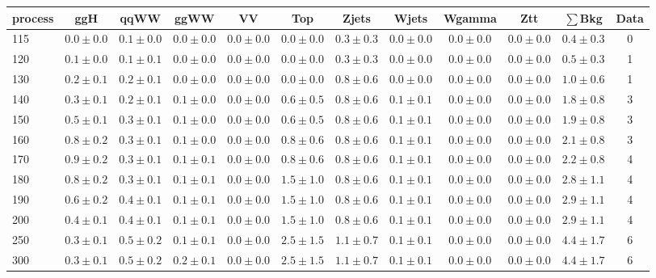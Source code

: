 \begin{table}
{\footnotesize
 \begin{center}
 \begin{tabular}{l c c c c c c c c c c c }
 \hline
 process & ggH & qqWW & ggWW & VV & Top & Zjets & Wjets & Wgamma & Ztt & $\sum$Bkg & Data \\
 \hline
115 & $0.0\pm0.0$ & $0.1\pm0.0$ & $0.0\pm0.0$ & $0.0\pm0.0$ & $0.0\pm0.0$ & $0.3\pm0.3$ & $0.0\pm0.0$ & $0.0\pm0.0$ & $0.0\pm0.0$ & $0.4\pm0.3$ & 0 \\
120 & $0.1\pm0.0$ & $0.1\pm0.1$ & $0.0\pm0.0$ & $0.0\pm0.0$ & $0.0\pm0.0$ & $0.3\pm0.3$ & $0.0\pm0.0$ & $0.0\pm0.0$ & $0.0\pm0.0$ & $0.5\pm0.3$ & 1 \\
130 & $0.2\pm0.1$ & $0.2\pm0.1$ & $0.0\pm0.0$ & $0.0\pm0.0$ & $0.0\pm0.0$ & $0.8\pm0.6$ & $0.0\pm0.0$ & $0.0\pm0.0$ & $0.0\pm0.0$ & $1.0\pm0.6$ & 1 \\
140 & $0.3\pm0.1$ & $0.2\pm0.1$ & $0.1\pm0.0$ & $0.0\pm0.0$ & $0.6\pm0.5$ & $0.8\pm0.6$ & $0.1\pm0.1$ & $0.0\pm0.0$ & $0.0\pm0.0$ & $1.8\pm0.8$ & 3 \\
150 & $0.5\pm0.1$ & $0.3\pm0.1$ & $0.1\pm0.0$ & $0.0\pm0.0$ & $0.6\pm0.5$ & $0.8\pm0.6$ & $0.1\pm0.1$ & $0.0\pm0.0$ & $0.0\pm0.0$ & $1.9\pm0.8$ & 3 \\
160 & $0.8\pm0.2$ & $0.3\pm0.1$ & $0.1\pm0.0$ & $0.0\pm0.0$ & $0.8\pm0.6$ & $0.8\pm0.6$ & $0.1\pm0.1$ & $0.0\pm0.0$ & $0.0\pm0.0$ & $2.1\pm0.8$ & 3 \\
170 & $0.9\pm0.2$ & $0.3\pm0.1$ & $0.1\pm0.1$ & $0.0\pm0.0$ & $0.8\pm0.6$ & $0.8\pm0.6$ & $0.1\pm0.1$ & $0.0\pm0.0$ & $0.0\pm0.0$ & $2.2\pm0.8$ & 4 \\
180 & $0.8\pm0.2$ & $0.3\pm0.1$ & $0.1\pm0.1$ & $0.0\pm0.0$ & $1.5\pm1.0$ & $0.8\pm0.6$ & $0.1\pm0.1$ & $0.0\pm0.0$ & $0.0\pm0.0$ & $2.8\pm1.1$ & 4 \\
190 & $0.6\pm0.2$ & $0.4\pm0.1$ & $0.1\pm0.1$ & $0.0\pm0.0$ & $1.5\pm1.0$ & $0.8\pm0.6$ & $0.1\pm0.1$ & $0.0\pm0.0$ & $0.0\pm0.0$ & $2.9\pm1.1$ & 4 \\
200 & $0.4\pm0.1$ & $0.4\pm0.1$ & $0.1\pm0.1$ & $0.0\pm0.0$ & $1.5\pm1.0$ & $0.8\pm0.6$ & $0.1\pm0.1$ & $0.0\pm0.0$ & $0.0\pm0.0$ & $2.9\pm1.1$ & 4 \\
250 & $0.3\pm0.1$ & $0.5\pm0.2$ & $0.1\pm0.1$ & $0.0\pm0.0$ & $2.5\pm1.5$ & $1.1\pm0.7$ & $0.1\pm0.1$ & $0.0\pm0.0$ & $0.0\pm0.0$ & $4.4\pm1.7$ & 6 \\
300 & $0.3\pm0.1$ & $0.5\pm0.2$ & $0.2\pm0.1$ & $0.0\pm0.0$ & $2.5\pm1.5$ & $1.1\pm0.7$ & $0.1\pm0.1$ & $0.0\pm0.0$ & $0.0\pm0.0$ & $4.4\pm1.7$ & 6 \\

\end{tabular}
\end{center}}
\end{table}
